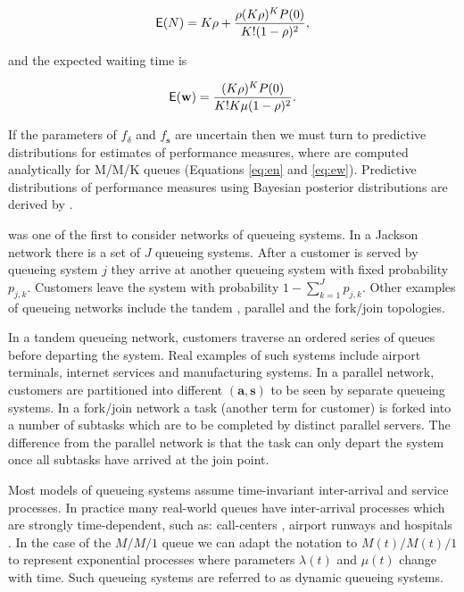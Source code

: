 \documentclass[article]{jss}
\begin{document}
\begin{align}
\mathsf{E}(N) = K\rho + \frac{\rho (K\rho)^K P(0)}{K!(1-\rho)^2} \label{eq:en},
\end{align}

and the expected waiting time is

\begin{align}
\mathsf{E}(\mathbf{w}) = \frac{(K \rho)^K P(0)}{K! K \mu(1-\rho)^2} \label{eq:ew}.
\end{align}

If the parameters of $f_\delta$ and $f_{\mathbf{s}}$ are uncertain then we must turn to predictive distributions for estimates of performance measures, where are computed analytically for M/M/K queues (Equations \ref{eq:en} and \ref{eq:ew}). Predictive distributions of performance measures using Bayesian posterior distributions are derived by \citet{armero1994bayesian, armero1999dealing}.  

\citet{jackson_networks_1957} was one of the first to consider networks of queueing systems. In a Jackson network there is a set of $J$ queueing systems. After a customer is served by queueing system $j$ they arrive at another queueing system with fixed probability $p_{j,k}$. Customers leave the system with probability $1 - \sum_{k=1}^{J} p_{j,k}$. Other examples of queueing networks include the tandem \citep{glynn_departures_1991}, parallel \citep{hunt_fast_1995} and the fork/join \citep{kim_analysis_1989} topologies. 

In a tandem queueing network, customers traverse an ordered series of queues before departing the system. Real examples of such systems include airport terminals, internet services and manufacturing systems. In a parallel network, customers are partitioned into different $\mathbf{(a,s)}$ to be seen by separate queueing systems. In a fork/join network a task (another term for customer) is forked into a number of subtasks which are to be completed by distinct parallel servers. The difference from the parallel network is that the task can only depart the system once all subtasks have arrived at the join point. 

Most models of queueing systems assume time-invariant inter-arrival and service processes. In practice many real-world queues have inter-arrival processes which are strongly time-dependent, such as: call-centers \citep{weinberg2007bayesian, brown2005statistical}, airport runways \citep{koopman1972air} and hospitals \citep{brahimi_queueing_1991}. In the case of the $M/M/1$ queue we can adapt the notation to $M(t)/M(t)/1$ to represent exponential  processes where parameters $\lambda(t)$ and $\mu(t)$ change with time. Such queueing systems are referred to as dynamic queueing systems.  
\end{document}
